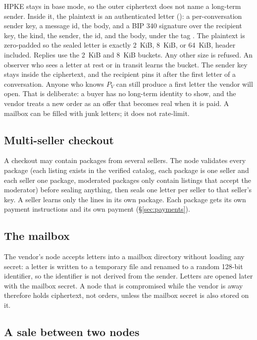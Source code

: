HPKE stays in base mode, so the outer ciphertext does not name a long-term sender. Inside it, the plaintext is an authenticated letter (): a per-conversation sender key, a message id, the body, and a BIP 340 signature over the recipient key, the kind, the sender, the id, and the body, under the tag . The plaintext is zero-padded so the sealed letter is exactly 2~KiB, 8~KiB, or 64~KiB, header included. Replies use the 2~KiB and 8~KiB buckets. Any other size is refused. An observer who sees a letter at rest or in transit learns the bucket. The sender key stays inside the ciphertext, and the recipient pins it after the first letter of a conversation. Anyone who knows $P_V$ can still produce a first letter the vendor will open. That is deliberate: a buyer has no long-term identity to show, and the vendor treats a new order as an offer that becomes real when it is paid. A mailbox can be filled with junk letters; it does not rate-limit.

\subsection{Multi-seller checkout}

A checkout may contain packages from several sellers. The node validates every package (each listing exists in the verified catalog, each package is one seller and each seller one package, moderated packages only contain listings that accept the moderator) before sealing anything, then seals one letter per seller to that seller's key. A seller learns only the lines in its own package. Each package gets its own payment instructions and its own payment (\S\ref{sec:payments}).

\subsection{The mailbox}

The vendor's node accepts letters into a mailbox directory without loading any secret: a letter is written to a temporary file and renamed to a random 128-bit identifier, so the identifier is not derived from the sender. Letters are opened later with the mailbox secret. A node that is compromised while the vendor is away therefore holds ciphertext, not orders, unless the mailbox secret is also stored on it.

\subsection{A sale between two nodes}
\label{sec:sale}

